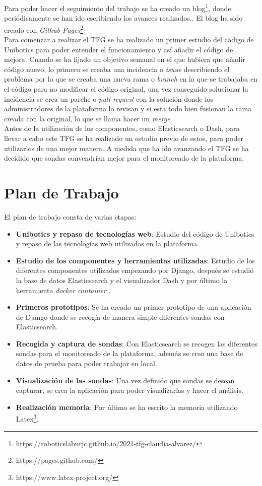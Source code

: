 Para poder hacer el seguimiento del trabajo se ha creado un blog\footnote{https://roboticslaburjc.github.io/2021-tfg-claudia-alvarez/}, donde periódicamente se han ido escribiendo los avances realizados.. El blog ha sido creado con \textit{Github-Pages}\footnote{https://pages.github.com/}\\

Para comenzar a realizar el TFG se ha realizado un primer estudio del código de Unibotics para poder entender el funcionamiento y así añadir el código de mejora. Cuando se ha fijado un objetivo semanal en el que hubiera que añadir código nuevo, lo primero se creaba una incidencia o \textit{isuue} describiendo el problema por lo que se creaba una nueva rama o \textit{branch} en la que se trabajaba en el código para no modificar el código original, una vez conseguido solucionar la incidencia se crea un parche o \textit{pull request} con la solución donde los administradores de la plataforma lo revisan y si esta todo bien fusionan la rama creada con la original, lo que se llama hacer un \textit{merge}.\\

Antes de la utilización de los componentes, como Elasticsearch o Dash,  para llevar a cabo este TFG se ha realizado un estudio previo de estos, para poder utilizarlos de una mejor manera. A medida que ha ido avanzando el TFG se ha decidido que sondas convendrían mejor para el monitoreado de la plataforma.

\newpage
\section{Plan de Trabajo}
El plan de trabajo consta de varias etapas:

\begin{itemize}
\item \textbf{Unibotics  y repaso de tecnologías web}: Estudio del código de Unibotics y repaso de las tecnologías web utilizadas en la plataforma.

\item \textbf{Estudio de los componentes y herramientas utilizadas}: Estudio de los diferentes componentes utilizados empezando por Django, después se estudió la base de datos Elasticsearch y el visualizador Dash y por último la herramienta \textit{docker container} .

\item \textbf{Primeros prototipos}: Se ha creado un primer prototipo de una aplicación de Django donde se recogía de manera simple diferentes sondas con Elasticsearch.

\item \textbf{Recogida y captura de sondas}: Con Elasticsearch se recogen las diferentes sondas para el monitoreado de la plataforma, además se creo una base de datos de prueba para poder trabajar en local.
\item \textbf{Visualización de las sondas}: Una vez definido que sondas se desean capturar, se crea la aplicación para poder visualizarlas y hacer el análisis.
\item \textbf{Realización memoria}: Por último se ha escrito la memoria utilizando Latex\footnote{https://www.latex-project.org/}.
\end{itemize}

